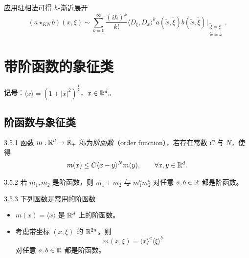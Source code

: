 应用驻相法可得 \(\hbar\)-渐近展开
\[
  (a\star_{KN}b)(x,\xi)
  \sim\sum_{k=0}^{\infty}\frac{(i\hbar)^k}{k!}
  \langle D_\xi,D_x\rangle^k
  a(\tilde x,\tilde\xi)b(\tilde x,\tilde\xi)
  \Big|_{\substack{\tilde\xi=\xi\\ \tilde x=x}}.
\]


\section{带阶函数的象征类}

\noindent\textbf{记号}：\(\langle x\rangle=(1+|x|^2)^{\frac12}\)，\(x\in\mathbb{R}^d\)。

\subsection{阶函数与象征类}

\begin{definition}{3.5.1}
  函数 \(m:\mathbb{R}^d\to\mathbb{R}_+\) 称为\emph{阶函数}（order function），若存在常数 \(C\) 与 \(N\)，使得
  \[
    m(x)\le C\langle x-y\rangle^{N}m(y),\qquad \forall x,y\in\mathbb{R}^d.
  \]
\end{definition}

\begin{proposition}{3.5.2}
  若 \(m_1,m_2\) 是阶函数，则 \(m_1+m_2\) 与 \(m_1^{a}m_2^{b}\) 对任意 \(a,b\in\mathbb{R}\) 都是阶函数。
\end{proposition}

\begin{example}{3.5.3}
  下列函数是常用的阶函数
  \begin{itemize}[leftmargin=2em,itemsep=1pt]
    \item \(m(x)=\langle x\rangle\) 是 \(\mathbb{R}^d\) 上的阶函数。
    \item 考虑带坐标 \((x,\xi)\) 的 \(\mathbb{R}^{2n}\)。则
    \[
      m(x,\xi)=\langle x\rangle^{a}\langle\xi\rangle^{b}
    \]
    对任意 \(a,b\in\mathbb{R}\) 都是阶函数。
  \end{itemize}
\end{example}

